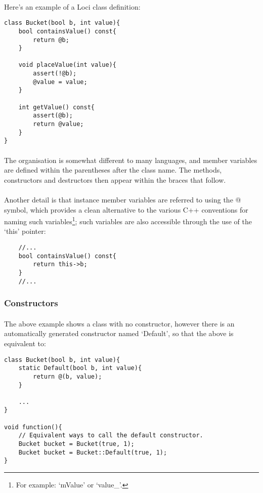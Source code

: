 \documentclass[12pt,twoside,notitlepage]{report}
\begin{document}
\paragraph{}
Here's an example of a Loci class definition:


\begin{lstlisting}
class Bucket(bool b, int value){
	bool containsValue() const{
		return @b;
	}
	
	void placeValue(int value){
		assert(!@b);
		@value = value;
	}
	
	int getValue() const{
		assert(@b);
		return @value;
	}
}
\end{lstlisting}


\paragraph{}
The organisation is somewhat different to many languages, and member variables are defined within the parentheses after the class name. The methods, constructors and destructors then appear within the braces that follow.

\paragraph{}
Another detail is that instance member variables are referred to using the @ symbol, which provides a clean alternative to the various C++ conventions for naming such variables\footnote{For example: `mValue' or `value\_'.}; such variables are also accessible through the use of the `this' pointer:


\begin{lstlisting}
	//...
	bool containsValue() const{
		return this->b;
	}
	//...
\end{lstlisting}


\subsubsection{Constructors}

\paragraph{}
The above example shows a class with no constructor, however there is an automatically generated constructor named `Default', so that the above is equivalent to:


\begin{lstlisting}
class Bucket(bool b, int value){
	static Default(bool b, int value){
		return @(b, value);
	}

	...
}

void function(){
	// Equivalent ways to call the default constructor.
	Bucket bucket = Bucket(true, 1);
	Bucket bucket = Bucket::Default(true, 1);
}
\end{lstlisting}
\end{document}
